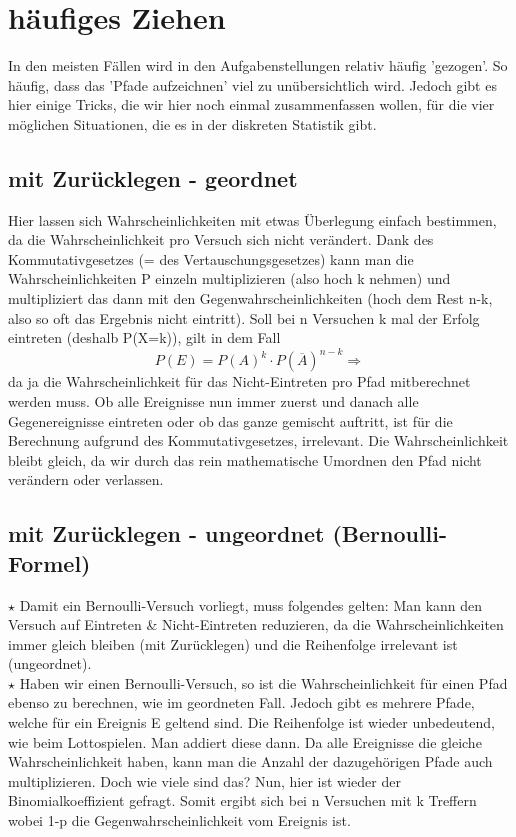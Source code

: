 \section{häufiges Ziehen}
	In den meisten Fällen wird in den Aufgabenstellungen relativ häufig 'gezogen'.
	So häufig, dass das 'Pfade aufzeichnen' viel zu unübersichtlich wird. Jedoch
	gibt es hier einige Tricks, die wir hier noch einmal zusammenfassen wollen, für
	die vier möglichen Situationen, die es in der diskreten Statistik gibt.

	\subsection{mit Zurücklegen - geordnet}
		Hier lassen sich Wahrscheinlichkeiten mit etwas Überlegung einfach bestimmen,
		da die Wahrscheinlichkeit pro Versuch sich nicht verändert. Dank des
		Kommutativgesetzes (= des Vertauschungsgesetzes) kann man die
		Wahrscheinlichkeiten P einzeln multiplizieren (also hoch k nehmen) und
		multipliziert das dann mit den Gegenwahrscheinlichkeiten (hoch dem Rest n-k,
		also so oft das Ergebnis nicht eintritt). Soll bei n Versuchen k mal der
		Erfolg eintreten (deshalb P(X=k)), gilt in dem Fall
		\[P(E)=P(A)^k\cdot P(\overline{A})^{n-k} \Rightarrow\]
		\formel{\[P(X=k)=p^k\cdot(1-p)^{n-k}\]}
		da ja die Wahrscheinlichkeit für das Nicht-Eintreten pro Pfad mitberechnet
		werden muss. Ob alle Ereignisse nun immer zuerst und danach alle
		Gegenereignisse eintreten oder ob das ganze gemischt auftritt, ist für die
		Berechnung aufgrund des Kommutativgesetzes, irrelevant. Die Wahrscheinlichkeit
		bleibt gleich, da wir durch das rein mathematische Umordnen den Pfad nicht
		verändern oder verlassen.

	\subsection{mit Zurücklegen - ungeordnet (Bernoulli-Formel)}
		\(\star\) Damit ein Bernoulli-Versuch vorliegt, muss folgendes gelten: Man
		kann den Versuch auf Eintreten \& Nicht-Eintreten reduzieren, da die
		Wahrscheinlichkeiten immer gleich bleiben (mit Zurücklegen) und die
		Reihenfolge irrelevant ist (ungeordnet).\\
		
		\(\star\) Haben wir einen Bernoulli-Versuch, so ist die Wahrscheinlichkeit für
		einen Pfad ebenso zu berechnen, wie im geordneten Fall. Jedoch gibt es mehrere
		Pfade, welche für ein Ereignis E geltend sind. Die Reihenfolge ist wieder
		unbedeutend, wie beim Lottospielen. Man addiert diese dann. Da alle Ereignisse
		die gleiche Wahrscheinlichkeit haben, kann man die Anzahl der dazugehörigen
		Pfade auch multiplizieren. Doch wie viele sind das? Nun, hier ist wieder der
		Binomialkoeffizient gefragt. Somit ergibt sich bei n Versuchen mit k Treffern
		\formel{\[P(X=k)=B(k,p,n)=\binom{n}{k}\cdot p^k\cdot (1-p)^{n-k}\]}
		wobei 1-p die Gegenwahrscheinlichkeit vom Ereignis ist.
